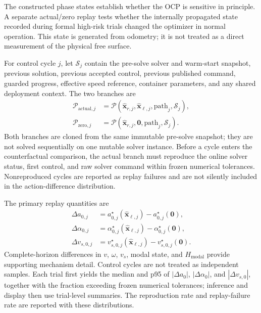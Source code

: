 The constructed phase states establish whether the OCP is sensitive in
principle. A separate actual/zero replay tests whether the internally propagated
state recorded during formal high-risk trials changed the optimizer in normal
operation. This state is generated from odometry; it is not treated as a direct
measurement of the physical free surface.

For control cycle $j$, let $\mathcal S_j$ contain the pre-solve solver and
warm-start snapshot, previous solution, previous accepted control, previous
published command, guarded progress, effective speed reference, container
parameters, and any shared deployment context. The two branches are
\begin{equation}
\begin{aligned}
\mathcal P_{\mathrm{actual},j}
&=\mathcal P(\hat{\bm x}_{r,j},\hat{\bm x}_{\ell,j},
\mathrm{path}_j,\mathcal S_j),\\
\mathcal P_{\mathrm{zero},j}
&=\mathcal P(\hat{\bm x}_{r,j},\bm 0,
\mathrm{path}_j,\mathcal S_j).
\end{aligned}
\label{eq:actual_zero_replay}
\end{equation}
Both branches are cloned from the same immutable pre-solve snapshot; they are
not solved sequentially on one mutable solver instance. Before a cycle enters
the counterfactual comparison, the actual branch must reproduce the online
solver status, first control, and raw solver command within frozen numerical
tolerances. Nonreproduced cycles are reported as replay failures and are not
silently included in the action-difference distribution.

The primary replay quantities are
\begin{equation}
\begin{aligned}
\Delta a_{0,j}
&=a_{0,j}^{\star}(\hat{\bm x}_{\ell,j})
-a_{0,j}^{\star}(\bm 0),\\
\Delta\alpha_{0,j}
&=\alpha_{0,j}^{\star}(\hat{\bm x}_{\ell,j})
-\alpha_{0,j}^{\star}(\bm 0),\\
\Delta v_{s,0,j}
&=v_{s,0,j}^{\star}(\hat{\bm x}_{\ell,j})
-v_{s,0,j}^{\star}(\bm 0).
\end{aligned}
\label{eq:replay_first_action_difference}
\end{equation}
Complete-horizon differences in $v$, $\omega$, $v_s$, modal state, and
$H_{\mathrm{modal}}$ provide supporting mechanism detail. Control cycles are
not treated as independent samples. Each trial first yields the median and p95
of $|\Delta a_0|$, $|\Delta\alpha_0|$, and $|\Delta v_{s,0}|$, together with
the fraction exceeding frozen numerical tolerances; inference and display then
use trial-level summaries. The reproduction rate and replay-failure rate are
reported with these distributions.

